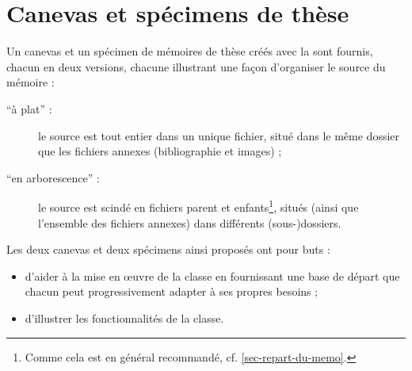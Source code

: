 \chapter{Canevas et spécimens de thèse}\label{cha-specimen-canevas}%
%
%

Un canevas et un spécimen de mémoires de thèse créés avec la \yatCl{} sont
fournis, chacun en deux versions, chacune illustrant une façon d'organiser le
source  du mémoire :
\begin{description}
\item[\enquote{à plat} :] le source est tout entier dans un unique fichier,
  situé dans le même dossier que les fichiers annexes (bibliographie et
  images) ;
\item[\enquote{en arborescence} :]%
  le source est scindé en fichiers parent et enfants\footnote{Comme cela est en
    général recommandé, cf. \vref{sec-repart-du-memo}.}, situés (ainsi que
  l'ensemble des fichiers annexes) dans différents (sous-)dossiers.
\end{description}
Les deux canevas et deux spécimens ainsi proposés ont pour buts :
\begin{itemize}
\item d'aider à la mise en œuvre de la classe en fournissant une base de départ
  que chacun peut progressivement adapter à ses propres
  besoins ;
\item d'illustrer les fonctionnalités de la classe.
\end{itemize}

